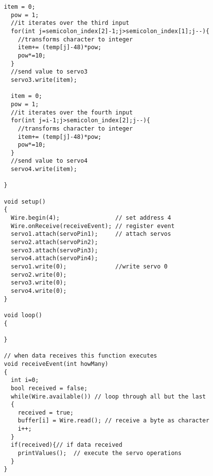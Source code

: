 \documentclass[pdftex,12pt,a4paper]{article}
\begin{document}
\begin{flushleft}
\begin{lstlisting}[language=Arduino]
  item = 0; 
  pow = 1;
  //it iterates over the third input
  for(int j=semicolon_index[2]-1;j>semicolon_index[1];j--){
    //transforms character to integer
    item+= (temp[j]-48)*pow;
    pow*=10;
  }
  //send value to servo3
  servo3.write(item);
 
  item = 0; 
  pow = 1;
  //it iterates over the fourth input
  for(int j=i-1;j>semicolon_index[2];j--){
    //transforms character to integer
    item+= (temp[j]-48)*pow;
    pow*=10;
  }
  //send value to servo4
  servo4.write(item);
 
}

void setup()
{
  Wire.begin(4);                // set address 4
  Wire.onReceive(receiveEvent); // register event
  servo1.attach(servoPin1);		// attach servos
  servo2.attach(servoPin2);
  servo3.attach(servoPin3);
  servo4.attach(servoPin4);
  servo1.write(0);				//write servo 0
  servo2.write(0);
  servo3.write(0);
  servo4.write(0);
}

void loop()
{

}

// when data receives this function executes
void receiveEvent(int howMany)
{
  int i=0;
  bool received = false;
  while(Wire.available()) // loop through all but the last
  {
    received = true;
    buffer[i] = Wire.read(); // receive a byte as character
    i++;
  }
  if(received){// if data received
	printValues();	// execute the servo operations
  }
}
\end{lstlisting}

\end{flushleft}
\end{document}
